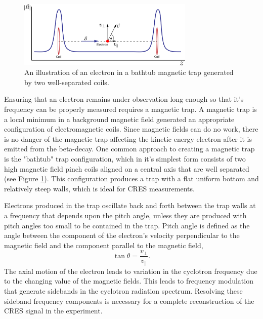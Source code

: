 \begin{figure}[htbp]
    \centering
    \includegraphics*[width=0.75\textwidth]{figs/Chapter-3/230628_bathtub_trap.png}
    \caption{\label{fig:chap3-bathtub-trap}An illustration of an electron in a bathtub magnetic trap generated by two well-separated coils.}
\end{figure}

Ensuring that an electron remains under observation long enough so that it's frequency can be properly measured requires a magnetic trap. A magnetic trap is a local minimum in a background magnetic field generated an appropriate configuration of electromagnetic coils. Since magnetic fields can do no work, there is no danger of the magnetic trap affecting the kinetic energy electron after it is emitted from the beta-decay. One common approach to creating a magnetic trap is the "bathtub" trap configuration, which in it's simplest form consists of two high magnetic field pinch coils aligned on a central axis that are well separated (see Figure \ref{fig:chap3-bathtub-trap}). This configuration produces a trap with a flat uniform bottom and relatively steep walls, which is ideal for CRES measurements. 

Electrons produced in the trap oscillate back and forth between the trap walls at a frequency that depends upon the pitch angle, unless they are produced with pitch angles too small to be contained in the trap. Pitch angle is defined as the angle between the component of the electron's velocity perpendicular to the magnetic field and the component parallel to the magnetic field,
\begin{equation}
    \tan{\theta}=\frac{v_\perp}{v_\parallel}.
\end{equation}
The axial motion of the electron leads to variation in the cyclotron frequency due to the changing value of the magnetic fields. This leads to frequency modulation that generate sidebands in the cyclotron radiation spectrum. Resolving these sideband frequency components is necessary for a complete reconstruction of the CRES signal in the experiment.


